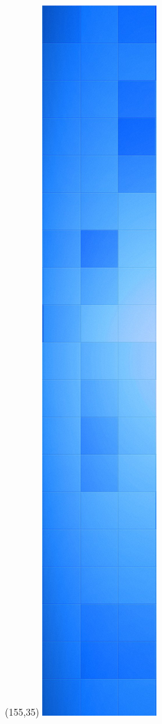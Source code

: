 \thispagestyle{empty}
\begin{textblock}{1}(155,35)
\includegraphics[scale=0.25]{bilder/allgemein/deckblatt.png}
\end{textblock}
